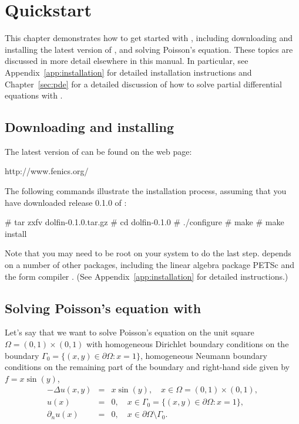 \chapter{Quickstart}
\label{chap:quickstart}

This chapter demonstrates how to get started with \dolfin{}, including
downloading and installing the latest version of \dolfin{}, and solving
Poisson's equation. These topics are discussed in more detail
elsewhere in this manual. In particular, see
Appendix~\ref{app:installation} for detailed installation instructions
and Chapter~\ref{sec:pde} for a detailed discussion of how to solve
partial differential equations with \dolfin{}.

\section{Downloading and installing \dolfin{}}

The latest version of \dolfin{} can be found on the \fenics{} web page:
\begin{code}
  http://www.fenics.org/
\end{code}
The following commands illustrate the installation process, assuming
that you have downloaded release 0.1.0 of \dolfin{}:
\begin{code}
  # tar zxfv dolfin-0.1.0.tar.gz
  # cd dolfin-0.1.0
  # ./configure
  # make
  # make install
\end{code}

Note that you may need to be root on your system to do the last
step. \dolfin{} depends on a number of other packages, including
the linear algebra package PETSc and the form compiler \ffc{}.
(See Appendix~\ref{app:installation} for detailed instructions.)

\section{Solving Poisson's equation with \dolfin{}}

Let's say that we want to solve Poisson's equation on the unit square
$\Omega = (0,1) \times (0,1)$ with homogeneous Dirichlet boundary
conditions on the boundary $\Gamma_0 = \{(x, y) \in \partial \Omega : x = 1\}$,
homogeneous Neumann boundary conditions on the remaining part of the boundary
and right-hand side given by $f = x \sin(y)$,
\begin{eqnarray} \label{eq:poisson,quickstart}
  - \Delta u(x, y) &=& x \sin(y), \quad
  x \in \Omega = (0,1) \times (0,1), \\
  u(x) &=& 0, \quad
  x \in \Gamma_0 = \{(x, y) \in \partial \Omega : x = 1\}, \\
  \partial_n u(x) &=& 0, \quad
  x \in \partial \Omega \setminus \Gamma_0.
\end{eqnarray}

